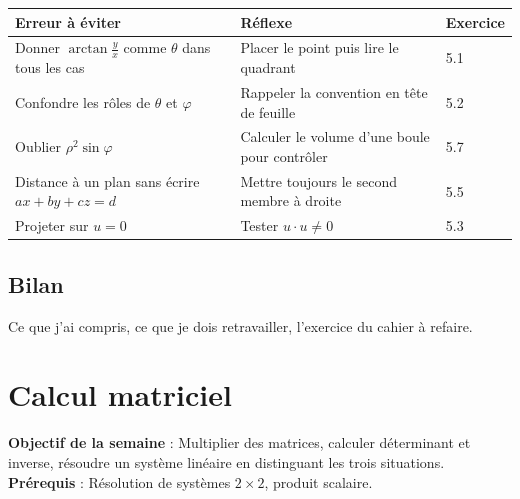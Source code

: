 \documentclass[10.5pt,a4paper]{article}
\newif\ifprof
\newcommand{\synth}{\textsf{\textcolor{ardoise}{(synthèse)}}}
\newcommand{\profonly}[1]{\ifprof #1\fi}
\newcommand{\titrecourant}{Guide de séquence}
\begin{document}
\else
\begin{longtable}{@{}p{7.2cm}p{7.2cm}p{1.6cm}@{}}
\toprule \textbf{Erreur à éviter} & \textbf{Réflexe} & \textbf{Exercice}\\ \midrule\endhead
Donner $\arctan\frac yx$ comme $\theta$ dans tous les cas & Placer le point puis lire le quadrant & 5.1\\
Confondre les rôles de $\theta$ et $\varphi$ & Rappeler la convention en tête de feuille & 5.2\\
Oublier $\rho^2\sin\varphi$ & Calculer le volume d'une boule pour contrôler & 5.7\\
Distance à un plan sans écrire $ax+by+cz=d$ & Mettre toujours le second membre à droite & 5.5\\
Projeter sur $u=0$ & Tester $u\cdot u\ne0$ & 5.3\\
\bottomrule\end{longtable}
\fi
\profonly{\subsection{Différenciation et variante FLE/FLS}
Étayage : fiche de conversion des trois repères. Niveaux : 5.1 (socle), 5.5 (intermédiaire), 5.7 (approfondissement). FLE/FLS : lexique produit scalaire/dot product, plan tangent/tangent plane, boule/ball.
\subsection{Évaluation}
Contrôle du cahier \S5.6 (20 points). Barème et corrigé : voir le cahier. Les causes d'erreur ci-dessus sont des hypothèses didactiques, non des constats \synth.}
\subsection{Bilan}
\ifprof À renseigner après la semaine : notions mal acquises, temps réel, réajustements.\else Ce que j'ai compris, ce que je dois retravailler, l'exercice du cahier à refaire.\fi
\clearpage
\section{Calcul matriciel}
\renewcommand{\titrecourant}{Semaine 6}
\begin{objectif}\textbf{Objectif de la semaine} : Multiplier des matrices, calculer déterminant et inverse, résoudre un système linéaire en distinguant les trois situations.\\\textbf{Prérequis} : Résolution de systèmes $2\times2$, produit scalaire.\end{objectif}
\end{document}
